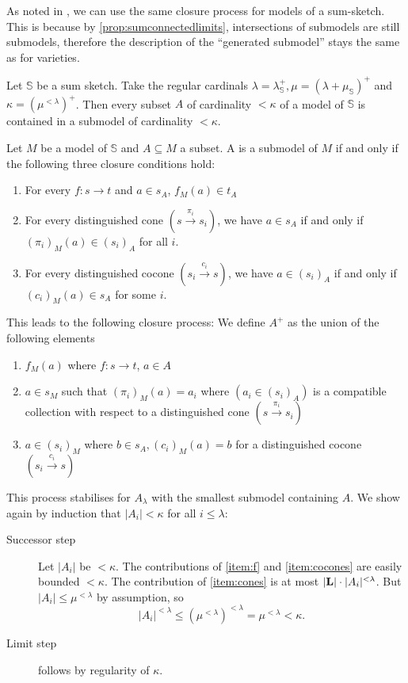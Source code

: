 As noted in \cite[\nopp~3.3.3]{MakkaiPare}, we can use the same closure process for models of a sum-sketch. This is because by \ref{prop:sumconnectedlimits}, intersections of submodels are still submodels, therefore the description of the ``generated submodel'' stays the same as for varieties.
\begin{Proposition}
Let $\mathbb S$ be a sum sketch. Take the regular cardinals $\lambda = \lambda^+_\mathbb S, \mu = (\lambda + \mu_\mathbb S)^+$ and $\kappa = (\mu^{< \lambda})^+$. Then every subset $A$ of cardinality $< \kappa$ of a model of $\mathbb S$ is contained in a submodel of cardinality $< \kappa$.
\end{Proposition}
\begin{Proof}
Let $M$ be a model of $\mathbb S$ and $A \subseteq M$ a subset. A is a submodel of $M$ if and only if the following three closure conditions hold:
\begin{enumerate}
\item\label{item:f} For every $f : s \to t$ and $a \in s_A$, $f_M(a) \in t_A$
\item\label{item:cones} For every distinguished cone $(s \xrightarrow{\pi_i} s_i)$, we have $a \in s_A$ if and only if $(\pi_i)_M(a) \in (s_i)_A$ for all $i$.
\item\label{item:cocones} For every distinguished cocone $(s_i \xrightarrow{c_i} s)$, we have $a \in (s_i)_A$ if and only if $(c_i)_M(a) \in s_A$ for some $i$.
\end{enumerate}
This leads to the following closure process: We define $A^+$ as the union of the following elements
\begin{enumerate}
\item $f_M(a)$ where $f : s \to t$, $a \in A$
\item $a \in s_M$ such that $(\pi_i)_M(a) = a_i$ where $(a_i \in (s_i)_A)$ is a compatible collection with respect to a distinguished cone $(s \xrightarrow{\pi_i} s_i)$
\item $a \in (s_i)_M$ where $b \in s_A, (c_i)_M(a) = b$ for a distinguished cocone  $(s_i \xrightarrow{c_i} s)$
\end{enumerate}
This process stabilises for $A_\lambda$ with the smallest submodel containing $A$. We show again by induction that $|A_i| < \kappa$ for all $i \leq \lambda$: 
\begin{description}
\item[Successor step] Let $|A_i|$ be $< \kappa$. The contributions of \ref{item:f} and \ref{item:cocones} are easily bounded $< \kappa$. The contribution of \ref{item:cones} is at most $|\textbf{L}|\cdot |A_i|^{< \lambda}$. But $|A_i| \leq \mu^{< \lambda}$ by assumption, so \[ |A_i|^{< \lambda} \leq \left(\mu^{< \lambda}\right)^{< \lambda} = \mu^{< \lambda} < \kappa. \]
\item[Limit step] follows by regularity of $\kappa$.
\end{description}
\end{Proof}

